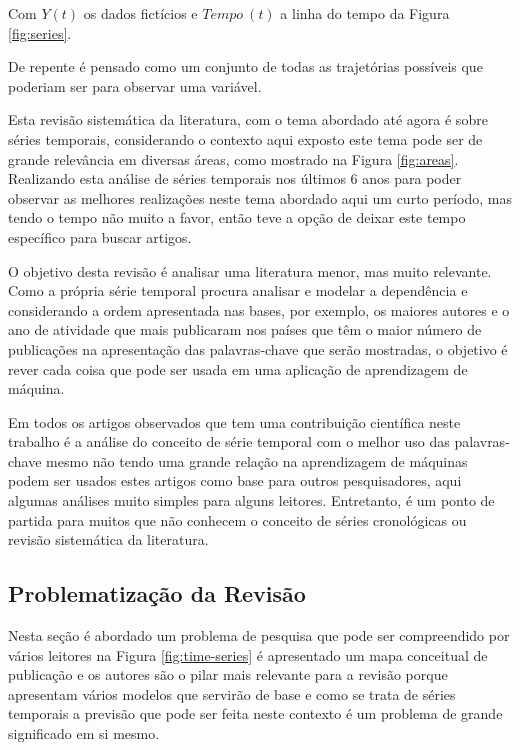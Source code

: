 

Com $Y(t)$ os dados fictícios e $Tempo \ (t)$ a linha do tempo da Figura \ref{fig:series}.

De repente é pensado como um conjunto de todas as trajetórias possíveis que poderiam ser para observar uma variável.


Esta revisão sistemática da literatura, com o tema abordado até agora é sobre séries temporais, considerando o contexto aqui exposto este tema pode ser de grande relevância em diversas áreas, como mostrado na Figura \ref{fig:areas}. Realizando esta análise de séries temporais nos últimos 6 anos para poder observar as melhores realizações neste tema abordado aqui um curto período, mas tendo o tempo não muito a favor, então teve a opção de deixar este tempo específico para buscar artigos.

O objetivo desta revisão é analisar uma literatura menor, mas muito relevante. Como a própria série temporal procura analisar e modelar a dependência e considerando a ordem apresentada nas bases, por exemplo, os maiores autores e o ano de atividade que mais publicaram nos países que têm o maior número de publicações na apresentação das palavras-chave que serão mostradas, o objetivo é rever cada coisa que pode ser usada em uma aplicação de aprendizagem de máquina.

Em todos os artigos observados que tem uma contribuição científica neste trabalho é a análise do conceito de série temporal com o melhor uso das palavras-chave mesmo não tendo uma grande relação na aprendizagem de máquinas podem ser usados estes artigos como base para outros pesquisadores, aqui algumas análises muito simples para alguns leitores. Entretanto, é um ponto de partida para muitos que não conhecem o conceito de séries cronológicas ou revisão sistemática da literatura.


\subsection{Problematiza\c c\~ao da Revis\~ao} \label{subsec: problematização da revisão}

Nesta seção é abordado um problema de pesquisa que pode ser compreendido por vários leitores na Figura \ref{fig:time-series} é apresentado um mapa conceitual de publicação e os autores são o pilar mais relevante para a revisão porque apresentam vários modelos que servirão de base e como se trata de séries temporais a previsão que pode ser feita neste contexto é um problema de grande significado em si mesmo.

